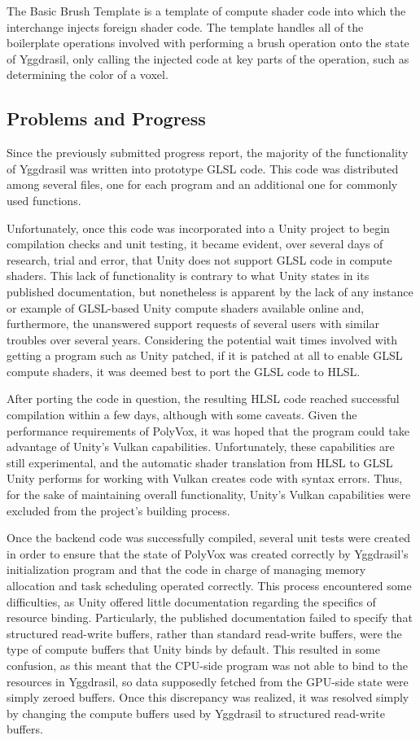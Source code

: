 \documentclass[onecolumn, draftclsnofoot,10pt, compsoc]{IEEEtran}
\begin{document}
The Basic Brush Template is a template of compute shader code into which the interchange injects foreign shader code. The template handles all of the boilerplate operations involved with performing a brush operation onto the state of Yggdrasil, only calling the injected code at key parts of the operation, such as determining the color of a voxel.

\subsection{Problems and Progress}
Since the previously submitted progress report, the majority of the functionality of Yggdrasil was written into prototype GLSL code. This code was distributed among several files, one for each program and an additional one for commonly used functions. 

Unfortunately, once this code was incorporated into a Unity project to begin compilation checks and unit testing, it became evident, over several days of research, trial and error, that Unity does not support GLSL code in compute shaders. This lack of functionality is contrary to what Unity states in its published documentation, but nonetheless is apparent by the lack of any instance or example of GLSL-based Unity compute shaders available online and, furthermore, the unanswered support requests of several users with similar troubles over several years. Considering the potential wait times involved with getting a program such as Unity patched, if it is patched at all to enable GLSL compute shaders, it was deemed best to port the GLSL code to HLSL.\cite{unity}

After porting the code in question, the resulting HLSL code reached successful compilation within a few days, although with some caveats. Given the performance requirements of PolyVox, it was hoped that the program could take advantage of Unity’s Vulkan capabilities. Unfortunately, these capabilities are still experimental, and the automatic shader translation from HLSL to GLSL Unity performs for working with Vulkan creates code with syntax errors. Thus, for the sake of maintaining overall functionality, Unity’s Vulkan capabilities were excluded from the project’s building process.

Once the backend code was successfully compiled, several unit tests were created in order to ensure that the state of PolyVox was created correctly by Yggdrasil’s initialization program and that the code in charge of managing memory allocation and task scheduling operated correctly. This process encountered some difficulties, as Unity offered little documentation regarding the specifics of resource binding. Particularly, the published documentation failed to specify that structured read-write buffers, rather than standard read-write buffers, were the type of compute buffers that Unity binds by default. This resulted in some confusion, as this meant that the CPU-side program was not able to bind to the resources in Yggdrasil, so data supposedly fetched from the GPU-side state were simply zeroed buffers. Once this discrepancy was realized, it was resolved simply by changing the compute buffers used by Yggdrasil to structured read-write buffers.
\end{document}
